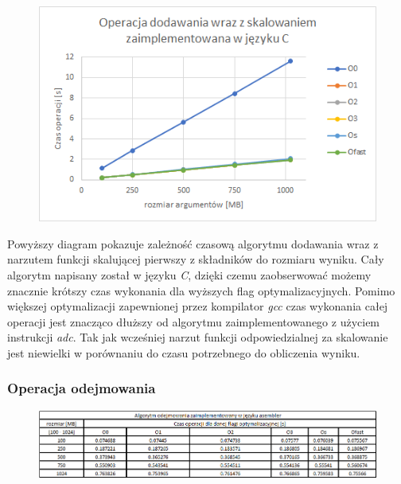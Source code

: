 \documentclass{article}
\begin{document}
\begin{figure}[h!]
\centering
\includegraphics[scale=0.75]{charts/add_scale_c_p.png}

\end{figure}

\vspace{5mm}

Powyższy diagram pokazuje zależność czasową algorytmu dodawania wraz z narzutem funkcji skalującej pierwszy z składników do rozmiaru wyniku. Cały algorytm napisany został w języku \textit{C}, dzięki czemu zaobserwować możemy znacznie krótszy czas wykonania dla wyższych flag optymalizacyjnych. Pomimo większej optymalizacji zapewnionej przez kompilator \textit{gcc} czas wykonania całej operacji jest znacząco dłuższy od algorytmu zaimplementowanego z użyciem instrukcji \textit{adc}. Tak jak wcześniej narzut funkcji odpowiedzialnej za skalowanie jest niewielki w porównaniu do czasu potrzebnego do obliczenia wyniku. 

\newpage{}

\subsubsection{Operacja odejmowania}

\begin{figure}[h!]

\includegraphics[scale=0.65]{charts/sbb_asm.png}

\end{figure}
\end{document}
